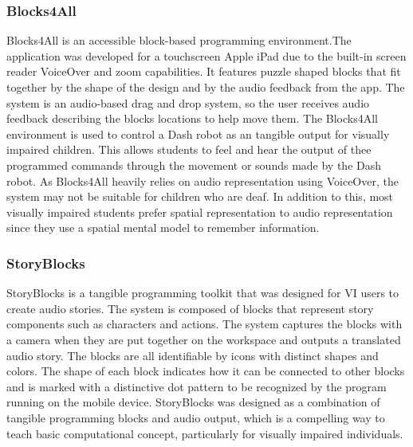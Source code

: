 \documentclass[oneside,%
                    author={Malak Hajji},
                    degree={BSc},
                    title={Designing An Accessible Computational Toolkit For Students},
                  subtitle={With Mixed Visual Abilities}]{dissertation}
\begin{document}
\subsubsection{Blocks4All}
Blocks4All is an accessible block-based programming environment\cite{blocksforall}.The application was developed for a touchscreen Apple iPad due to the built-in screen reader VoiceOver and zoom capabilities. It features puzzle shaped blocks that fit together by the shape of the design and by the audio feedback from the app. The system is an audio-based drag and drop system, so the user receives audio feedback describing the blocks locations to help move them. The Blocks4All environment is used to control a Dash robot as an tangible output for visually impaired children. This allows students to feel and hear the output of thee programmed commands through the movement or sounds made by the Dash robot. As Blocks4All heavily relies on audio representation using VoiceOver, the system may not be suitable for children who are deaf. In addition to this, most visually impaired students prefer spatial representation to audio representation since they use a spatial mental model to remember information.

\subsubsection{StoryBlocks}
StoryBlocks is a tangible programming toolkit that was designed for VI users to create audio stories. The system is composed of blocks that represent story components such as characters and actions. The system captures the blocks with a camera when they are put together on the workspace and outputs a translated audio story. The blocks are all identifiable by icons with distinct shapes and colors. The shape of each block indicates how it can be connected to other blocks and is marked with a distinctive dot pattern to be recognized by the program running on the mobile device. StoryBlocks was designed as a combination of tangible programming blocks and audio output, which is a compelling way to teach basic computational concept, particularly for visually impaired individuals.
\end{document}

